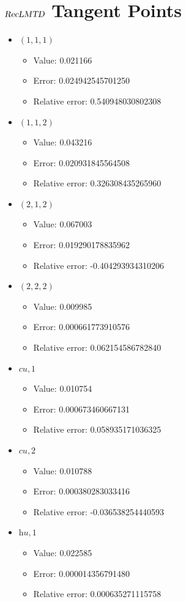 \documentclass{article}%
\begin{document}
\section{$\textsl{RecLMTD}$ Tangent Points}%
\thispagestyle{plain}%
\begin{itemize}%
	\item $(1, 1, 1)$%
	\begin{itemize}%
		\item Value: 0.021166%
		\item Error: 0.024942545701250%
		\item Relative error: 0.540948030802308%
	\end{itemize}%
	\item $(1, 1, 2)$%
	\begin{itemize}%
		\item Value: 0.043216%
		\item Error: 0.020931845564508%
		\item Relative error: 0.326308435265960%
	\end{itemize}%
	\item $(2, 1, 2)$%
	\begin{itemize}%
		\item Value: 0.067003%
		\item Error: 0.019290178835962%
		\item Relative error: -0.404293934310206%
	\end{itemize}%
	\item $(2, 2, 2)$%
	\begin{itemize}%
		\item Value: 0.009985%
		\item Error: 0.000661773910576%
		\item Relative error: 0.062154586782840%
	\end{itemize}%
	\item $\textit{cu},1$%
	\begin{itemize}%
		\item Value: 0.010754%
		\item Error: 0.000673460667131%
		\item Relative error: 0.058935171036325%
	\end{itemize}%
	\item $\textit{cu},2$%
	\begin{itemize}%
		\item Value: 0.010788%
		\item Error: 0.000380283033416%
		\item Relative error: -0.036538254440593%
	\end{itemize}%
	\item $\textit{hu},1$%
	\begin{itemize}%
		\item Value: 0.022585%
		\item Error: 0.000014356791480%
		\item Relative error: 0.000635271115758%
	\end{itemize}%
\end{itemize}%
\end{document}
